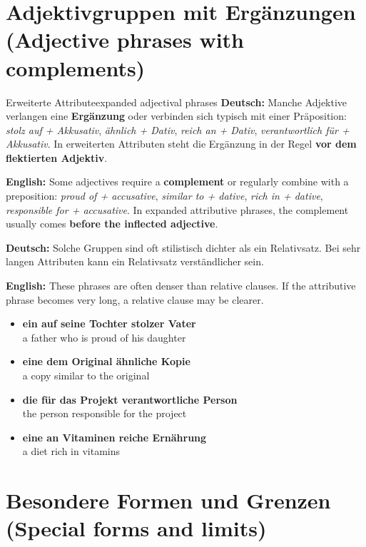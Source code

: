 \documentclass[a4paper,11pt]{article}
\newcommand{\GermanText}[1]{\textbf{Deutsch: }#1\par}
\newcommand{\EnglishText}[1]{{\small\color{SoftGray}\textbf{English: }#1\par}}
\newcommand{\ExampleItem}[2]{\item \textbf{#1}\\{\small\color{SoftGray}#2}}
\begin{document}
\section{Adjektivgruppen mit Ergänzungen \textnormal{(Adjective phrases with complements)}}
\begin{grammarentry}{Erweiterte Attribute}{expanded adjectival phrases}
\GermanText{Manche Adjektive verlangen eine \textbf{Ergänzung} oder verbinden sich typisch mit einer Präposition: \emph{stolz auf + Akkusativ}, \emph{ähnlich + Dativ}, \emph{reich an + Dativ}, \emph{verantwortlich für + Akkusativ}. In erweiterten Attributen steht die Ergänzung in der Regel \textbf{vor dem flektierten Adjektiv}.}
\EnglishText{Some adjectives require a \textbf{complement} or regularly combine with a preposition: \emph{proud of + accusative}, \emph{similar to + dative}, \emph{rich in + dative}, \emph{responsible for + accusative}. In expanded attributive phrases, the complement usually comes \textbf{before the inflected adjective}.}
\GermanText{Solche Gruppen sind oft stilistisch dichter als ein Relativsatz. Bei sehr langen Attributen kann ein Relativsatz verständlicher sein.}
\EnglishText{These phrases are often denser than relative clauses. If the attributive phrase becomes very long, a relative clause may be clearer.}
\end{grammarentry}
\begin{exbox}\begin{itemize}
\ExampleItem{ein auf seine Tochter stolzer Vater}{a father who is proud of his daughter}
\ExampleItem{eine dem Original ähnliche Kopie}{a copy similar to the original}
\ExampleItem{die für das Projekt verantwortliche Person}{the person responsible for the project}
\ExampleItem{eine an Vitaminen reiche Ernährung}{a diet rich in vitamins}
\end{itemize}\end{exbox}

\section{Besondere Formen und Grenzen \textnormal{(Special forms and limits)}}
\end{document}

